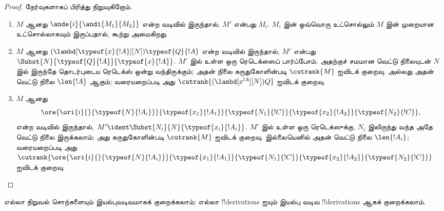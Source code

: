 \documentclass[../../../include/open-logic-section]{subfiles}
\begin{document}
\begin{proof}
  நேர்வுகளாகப் பிரித்து நிறுவுகிறோம்.
  \begin{enumerate}
  \item $M$ ஆனது $\ande{i}{\andi{M_1}{M_2}}$
    என்ற வடிவில் இருந்தால், $M'$ என்பது $M_i$.
    $M_i$ இன் ஒவ்வொரு உட்சொல்லும் $M$ இன் முறையான
    உட்சொல்லாகவும் இருப்பதால், கூற்று அமைகிறது.
  \item $M$ ஆனது
    $(\lambd[\typeof{x}{!A}][N])\typeof{Q}{!A}$
    என்ற வடிவில் இருந்தால், $M'$ என்பது
    $\Subst{N}{\typeof{Q}{!A}}{\typeof{x}{!A}}$.
    $M'$ இல் உள்ள ஒரு ரெடெக்ஸைப் பார்ப்போம்.
    அதற்குச் சமமான வெட்டு நிலையுடன் $N$ இல் இருந்தே
    தொடர்புடைய ரெடெக்ஸ் ஒன்று வந்திருக்கும்; அதன்
    நிலை கருதுகோளின்படி $\cutrank{M}$ ஐவிடக் குறைவு.
    அல்லது அதன் வெட்டு நிலை $\len{!A}$ ஆகும்;
    வரையறைப்படி அது
    $\cutrank{(\lambd[x^{!A}][N])Q}$ ஐவிடக் குறைவு.
  \item $M$ ஆனது
    \[
    \ore{\ori{i}{}{\typeof{N}{!A_i}}}
        {\typeof{x_1}{!A_1}}{\typeof{N_1}{!C}}
        {\typeof{x_2}{!A_2}}{\typeof{N_2}{!C}},
    \]
    என்ற வடிவில் இருந்தால்,
    $M' \ident \Subst{N_i}{N}{\typeof{x_i}{!A_i}}$.
    $M'$ இல் உள்ள ஒரு ரெடெக்ஸுக்கு, $N_i$ இலிருந்து
    வந்த அதே வெட்டு நிலை இருக்கலாம்; அது கருதுகோளின்படி
    $\cutrank{M}$ ஐவிடக் குறைவு. இல்லையெனில் அதன்
    வெட்டு நிலை $\len{!A_i}$; வரையறைப்படி அது
    $\cutrank{\ore{\ori{i}{}{\typeof{N}{!A_i}}}
      {\typeof{x_1}{!A_1}}{\typeof{N_1}{!C}}
      {\typeof{x_2}{!A_2}}{\typeof{N_2}{!C}}}$
    ஐவிடக் குறைவு.
  \end{enumerate}
\end{proof}

\begin{thm}
  எல்லா நிறுவல் சொற்களையும் இயல்புவடிவமாகக் குறைக்கலாம்;
  எல்லா !!{derivation}s ஐயும் இயல்பு வடிவ
  !!{derivation}s ஆகக் குறைக்கலாம்.
\end{thm}
\end{document}

